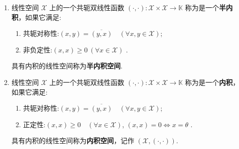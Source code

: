 \documentclass[../../main.tex]{subfiles}%
\begin{document}
\begin{definition}
\begin{enumerate}
\item 线性空间 $\mathscr{X}$ 上的一个共轭双线性函数 $(\cdot,\cdot):\mathscr{X}\times\mathscr{X}\to\mathbb{K}$ 称为是一个\textbf{半内积}，如果它满足:
\begin{enumerate}[(1)]
\item 共轭对称性:$(x,y)=\overline{(y,x)}\quad(\forall x,y\in\mathscr{X})$;
\item 非负定性:$(x,x)\geqslant 0\ (\forall x\in\mathscr{X})$ .
\end{enumerate}
具有内积的线性空间称为\textbf{半内积空间}.

\item 线性空间 $\mathscr{X}$ 上的一个共轭双线性函数 $(\cdot,\cdot):\mathscr{X}\times\mathscr{X}\to\mathbb{K}$ 称为是一个\textbf{内积}，如果它满足:
\begin{enumerate}[(1)]
\item 共轭对称性:$(x,y)=\overline{(y,x)}\quad(\forall x,y\in\mathscr{X})$;
\item 正定性:$(x,x)\geqslant 0\quad(\forall x\in\mathscr{X})$, $(x,x)=0\iff x=\theta$ .
\end{enumerate}
具有内积的线性空间称为\textbf{内积空间}，记作 $(\mathscr{X},(\cdot,\cdot))$.
\end{enumerate}
\end{definition}
\end{document}
